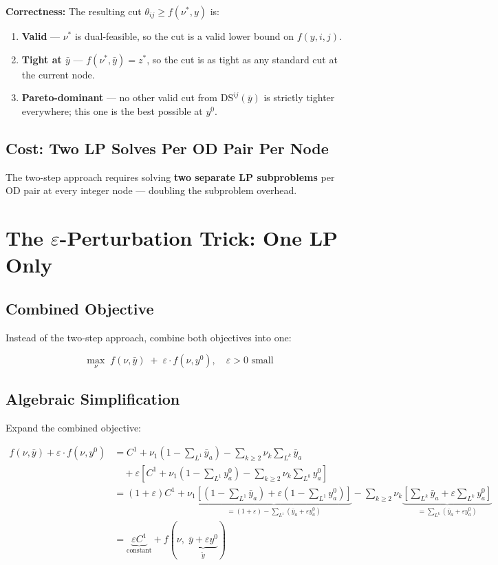 \documentclass[12pt,a4paper]{article}
\begin{document}
\textbf{Correctness:}  The resulting cut $\theta_{ij} \ge f(\nu^*, y)$ is:
\begin{enumerate}
  \item \textbf{Valid} — $\nu^*$ is dual-feasible, so the cut is a valid
        lower bound on $f(y,i,j)$.
  \item \textbf{Tight at $\bar{y}$} — $f(\nu^*, \bar{y}) = z^*$, so the cut is
        as tight as any standard cut at the current node.
  \item \textbf{Pareto-dominant} — no other valid cut from $\text{DS}^{ij}(\bar{y})$
        is strictly tighter everywhere; this one is the best possible at $y^0$.
\end{enumerate}

\subsection{Cost: Two LP Solves Per OD Pair Per Node}

The two-step approach requires solving \textbf{two separate LP subproblems}
per OD pair at every integer node — doubling the subproblem overhead.

\section{The $\varepsilon$-Perturbation Trick: One LP Only}

\subsection{Combined Objective}

Instead of the two-step approach, combine both objectives into one:

$$\max_\nu \; f(\nu, \bar{y}) \;+\; \varepsilon \cdot f(\nu, y^0), \quad \varepsilon > 0 \text{ small}$$

\subsection{Algebraic Simplification}

Expand the combined objective:

\begin{align}
f(\nu,\bar{y}) + \varepsilon \cdot f(\nu,y^0)
&= C^1 + \nu_1\!\left(1-\sum_{L^1}\bar{y}_a\right) - \sum_{k\ge2}\nu_k\sum_{L^k}\bar{y}_a \nonumber\\
&\quad + \varepsilon\left[C^1 + \nu_1\!\left(1-\sum_{L^1}y^0_a\right)
  - \sum_{k\ge2}\nu_k\sum_{L^k}y^0_a\right] \nonumber\\
&= (1+\varepsilon)C^1
  + \nu_1\!\underbrace{\left[(1-\sum_{L^1}\bar{y}_a)+\varepsilon(1-\sum_{L^1}y^0_a)\right]}_{
      = (1+\varepsilon) - \sum_{L^1}(\bar{y}_a+\varepsilon y^0_a)}
  - \sum_{k\ge2}\nu_k\underbrace{\left[\sum_{L^k}\bar{y}_a + \varepsilon\sum_{L^k}y^0_a\right]}_{
      = \sum_{L^k}(\bar{y}_a+\varepsilon y^0_a)} \nonumber\\
&= \underbrace{\varepsilon C^1}_{\text{constant}} + f\!\left(\nu,\;\underbrace{\bar{y}+\varepsilon y^0}_{\tilde{y}}\right)
\end{align}
\end{document}
